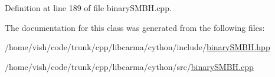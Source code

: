 Definition at line 189 of file binary\-S\-M\-B\-H.\-cpp.



The documentation for this class was generated from the following files\-:\begin{DoxyCompactItemize}
\item 
/home/vish/code/trunk/cpp/libcarma/cython/include/\hyperlink{binary_s_m_b_h_8hpp}{binary\-S\-M\-B\-H.\-hpp}\item 
/home/vish/code/trunk/cpp/libcarma/cython/src/\hyperlink{binary_s_m_b_h_8cpp}{binary\-S\-M\-B\-H.\-cpp}\end{DoxyCompactItemize}

